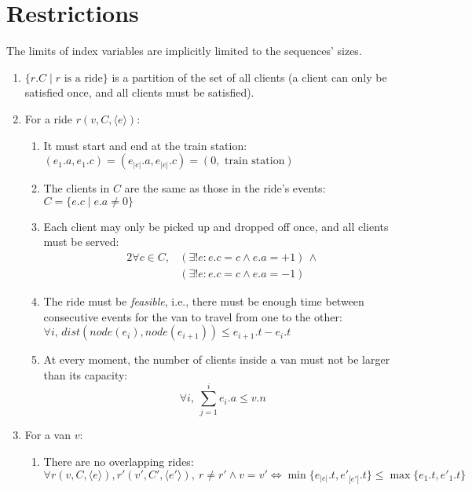 \section{Restrictions} \label{problem-formalization-restrictions}
The limits of index variables are implicitly limited to the sequences' sizes.
\begin{enumerate}
    \item $\{r.C \mid r \text{ is a ride}\}$ is a partition of the set of all clients (a client can only be satisfied once, and all clients must be satisfied).
    \item For a ride $r(v,C,\langle e \rangle)$:
    \begin{enumerate}
        \item It must start and end at the train station: $(e_1.a, e_1.c) = (e_{|e|}.a,e_{|e|}.c)=(0, \text{ train station})$
        \item The clients in $C$ are the same as those in the ride's events: $C=\{e.c \mid e.a \neq 0\}$
        \item Each client may only be picked up and dropped off once, and all clients must be served:
        \begin{alignat*}{2}
            \forall c \in C,
            &(\exists !e: e.c = c \wedge e.a = +1)\,\wedge \\
            &(\exists !e: e.c = c \wedge e.a = -1)
        \end{alignat*}
        \item The ride must be \emph{feasible}, i.e., there must be enough time between consecutive events for the van to travel from one to the other: $\forall i,\,dist(node(e_i), node(e_{i+1})) \leq e_{i+1}.t - e_i.t$
        \item At every moment, the number of clients inside a van must not be larger than its capacity:
        \begin{equation*}
            \forall i,~\sum_{j=1}^{i}{e_i.a} \leq v.n
        \end{equation*}
    \end{enumerate}
    \item For a van $v$:
    \begin{enumerate}
        \item There are no overlapping rides:
        \begin{equation*}
            \forall r(v,C,\langle e \rangle), r'(v',C',\langle e' \rangle),~r \neq r' \wedge v = v' \iff \min\{e_{|e|}.t,e'_{|e'|}.t\} \leq \max\{e_1.t,e'_1.t\}
        \end{equation*}
    \end{enumerate}
\end{enumerate}
